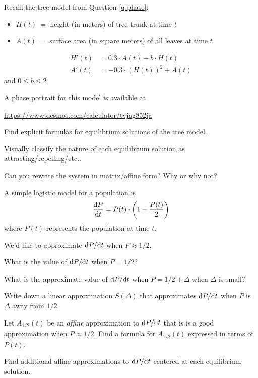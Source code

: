 \documentclass{workbook}
\begin{document}
\begin{slide}
	\question
	Recall the tree model from Question \ref{q-phase}:
	\begin{itemize}
		\item $H(t)\ =$ height (in meters) of tree trunk at time $t$
		\item $A(t)\ =$ surface area (in square meters) of all leaves at time $t$
	\end{itemize}
	\begin{align*}
		H'(t) &= 0.3\cdot A(t)-b\cdot H(t)\\
		A'(t) &= -0.3\cdot (H(t))^2 + A(t)
	\end{align*}
	and $0 \leq b \leq 2$

	A phase portrait for this model is available at 
	
		{\small
		\url{https://www.desmos.com/calculator/tvjag852ja}
		}
	\bigskip
	\phantom{x}
	\begin{parts}
		\item Find explicit formulas for equilibrium solutions of the tree model.
		\item Visually classify the nature of each equilibrium solution as attracting/repelling/etc..
		\item Can you rewrite the system in matrix/affine form? Why or why not?
	\end{parts}
	\bigskip
	\phantom{x}
\end{slide}

\begin{slide}
	\question
	A simple logistic model for a population is
	\[
		\frac{\mathrm{d} P}{\mathrm{d} t} = P(t)\cdot\left(1-\frac{P(t)}{2}\right)
	\]
	where $P(t)$ represents the population at time $t$.
	
	We'd like to approximate $\mathrm{d} P/\mathrm{d} t$ when $P\approx 1/2$.
	\begin{parts}
		\item What is the value of $\mathrm{d} P/\mathrm{d} t$ when $P=1/2$?
		\item What is the approximate value of $\mathrm{d} P/\mathrm{d} t$ when $P=1/2+\Delta$ when $\Delta$ is small?
		\item Write down a linear approximation $S(\Delta)$ that approximates $\mathrm{d} P/\mathrm{d} t$ when $P$ is $\Delta$ away from $1/2$.
		\item Let $A_{1/2}(t)$ be an \emph{affine} approximation to $\mathrm{d} P/\mathrm{d} t$ that is is a good approximation when $P\approx 1/2$.
		Find a formula for $A_{1/2}(t)$ expressed in terms of $P(t)$.
		\item Find additional affine approximations to $\mathrm{d} P/\mathrm{d} t$ centered at each equilibrium solution.
	\end{parts}
\end{slide}
\end{document}
